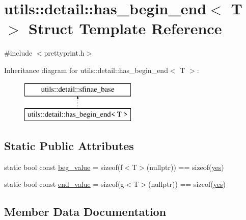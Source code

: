\hypertarget{structutils_1_1detail_1_1has__begin__end}{}\section{utils\+::detail\+::has\+\_\+begin\+\_\+end$<$ T $>$ Struct Template Reference}
\label{structutils_1_1detail_1_1has__begin__end}


{\ttfamily \#include $<$prettyprint.\+h$>$}

Inheritance diagram for utils\+::detail\+::has\+\_\+begin\+\_\+end$<$ T $>$\+:\begin{figure}[H]
\begin{center}
\leavevmode
\includegraphics[height=2.000000cm]{d5/db2/structutils_1_1detail_1_1has__begin__end}
\end{center}
\end{figure}
\subsection*{Static Public Attributes}
\begin{DoxyCompactItemize}
\item 
static bool const \mbox{\hyperlink{structutils_1_1detail_1_1has__begin__end_aa5b05edc0c3edd3590c0dbfd0fd42ab4}{beg\+\_\+value}} = sizeof(f$<$T$>$(nullptr)) == sizeof(\mbox{\hyperlink{structutils_1_1detail_1_1sfinae__base_ad5567f856d8b9af7d1af85c2555ce0e5}{yes}})
\item 
static bool const \mbox{\hyperlink{structutils_1_1detail_1_1has__begin__end_ad06063e05c3b604d2207e6c07e473770}{end\+\_\+value}} = sizeof(g$<$T$>$(nullptr)) == sizeof(\mbox{\hyperlink{structutils_1_1detail_1_1sfinae__base_ad5567f856d8b9af7d1af85c2555ce0e5}{yes}})
\end{DoxyCompactItemize}


\subsection{Member Data Documentation}
\mbox{\label{structutils_1_1detail_1_1has__begin__end_aa5b05edc0c3edd3590c0dbfd0fd42ab4}} 
